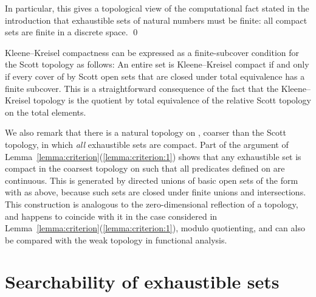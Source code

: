 \documentclass{LMCS}
\begin{document}
\begin{rem} \label{introduction}
In particular, this gives a topological view of the computational fact
stated in the introduction that exhaustible sets of natural numbers
must be finite: all compact sets are finite in a discrete space. \qed
\end{rem}
Kleene--Kreisel compactness can be expressed as a finite-subcover
condition for the Scott topology as follows: An entire set  is Kleene--Kreisel compact if and only if every cover of
 by Scott open sets that are closed under total equivalence has a
finite subcover.  This is a straightforward consequence of the fact
that the Kleene--Kreisel topology is the quotient by total equivalence
of the relative Scott topology on the total elements.








We also remark that there is a natural topology on , coarser than
the Scott topology, in which \emph{all} exhaustible sets are compact.
Part of the argument of
Lemma~\ref{lemma:criterion}(\ref{lemma:criterion:1}) shows that any
exhaustible set  is compact in the coarsest topology on  such
that all predicates  defined on  are
continuous.  This is generated by directed unions of basic open sets
of the form  with  as above, because such sets are
closed under finite unions and intersections.  This construction is
analogous to the zero-dimensional reflection of a topology, and
happens to coincide with it in the case considered in
Lemma~\ref{lemma:criterion}(\ref{lemma:criterion:1}), modulo
quotienting, and can also be compared with the weak topology in
functional analysis.


\section{Searchability  of exhaustible sets} 
\label{characterization}
\end{document}
